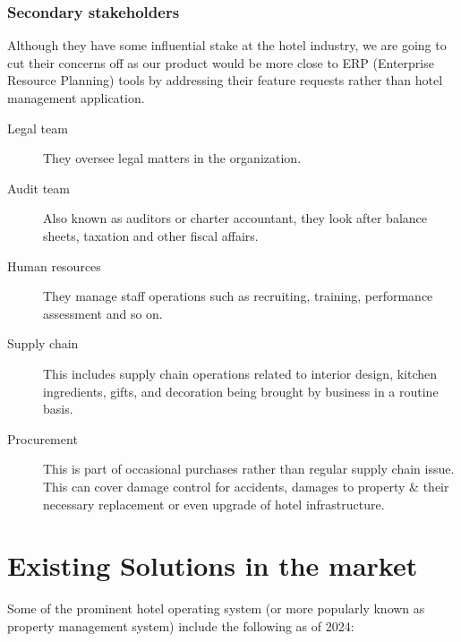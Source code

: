 \subsubsection{Secondary stakeholders}

Although they have some influential stake at the hotel industry, we are going to cut their concerns off as our product would be more close to ERP (Enterprise Resource Planning) tools by addressing their feature requests rather than hotel management application.

\begin{description}
	\item[Legal team] They oversee legal matters in the organization.
	\item[Audit team] Also known as auditors or charter accountant, they look after balance sheets, taxation and other fiscal affairs.
	\item[Human resources] They manage staff operations such as recruiting, training, performance assessment and so on.
	\item[Supply chain] This includes supply chain operations related to interior design, kitchen ingredients, gifts, and decoration being brought by business in a routine basis.
	\item[Procurement] This is part of occasional purchases rather than regular supply chain issue. This can cover damage control for accidents, damages to property \& their necessary replacement or even upgrade of hotel infrastructure.
\end{description}

\section[Existing Solutions]{Existing Solutions in the market}

Some of the prominent hotel operating system  (or more popularly known as property management system) include the following as of 2024: \cite{best_hotels_2024}

